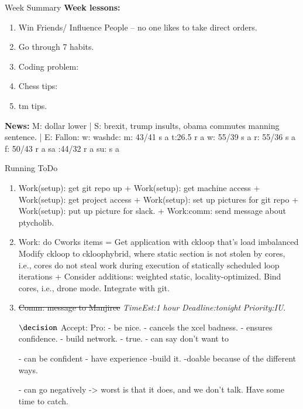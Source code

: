\documentclass[serif, mathserif, final]{beamer}
\newcommand{\doneTask}[1]{\tiny \item \tiny \sout{#1}}
\newcommand{\te}[1]{\textit{TimeEst:}\textit{#1}}
\newcommand{\dl}[1]{\textit{Deadline:}\textit{#1}}
\newcommand{\pr}[1]{\textit{Priority:}\textit{#1}}
\begin{document}
\begin{frame}
\begin{columns}
\begin{column}{0.5\linewidth}
\begin{block}{Week Summary}
    {\tiny {\bf Week lessons:}}
    \begin{enumerate}
      \tiny \item \tiny Win Friends/ Influence People – no one
      likes to take direct orders.
    \item \tiny Go through 7 habits.
    \item \tiny Coding problem: 
    \item \tiny Chess tips: 
    \item \tiny tm tips.
    \end{enumerate}
        {{\tiny {\bf News:}} M: dollar lower | S: brexit, trump
          insults, obama commutes manning sentence. 
          | E: Fallon:  
          w: washdc: {m: {43/41 s a}}  t:{26.5 r a} {w: {55/39 s a}} {r:
            {55/36 s a}} {f: {50/43 r a   }} {sa :{44/32 r a} }
          {su: { s a  }  } }
  \end{block}

  \begin{block}{Running ToDo} %
    \begin{enumerate} 
      
    {\bf Curr} $\rightarrow$ \\
    
  \item \tiny Work(setup): get git repo up + Work(setup): get
    machine access + Work(setup): get project access + Work(setup):
    set up pictures for git repo + Work(setup): put up picture for
    slack. +  Work:comm: send message about ptycholib. 
    
  \item \tiny Work: do Cworks items = Get application with ckloop
    that’s load imbalanced Modify ckloop to ckloophybrid, where
    static section is not stolen by cores, i.e., cores do not steal
    work during execution of statically scheduled loop iterations +
    Consider additions: weighted static, locality-optimized. Bind
    cores, i.e., drone mode. Integrate with git.
    
    \doneTask{Comm: message to Manjiree} \te{1 hour} \dl{tonight} \pr{IU}. 

    $\decision$
    Accept: 
    Pro: 
    - be nice. 
    - cancels the xcel badness. 
    - ensures confidence. 
    - build network. - true. 
    - can say don't want to 

    - can be confident - have experience -build it. -doable because of
    the different ways. 

    - can go negatively -> worst is that it does, and we don't
    talk. Have some time to catch. 
 

\end{enumerate}
\end{block}
\end{column}
\end{columns}
\end{frame}
\end{document}
